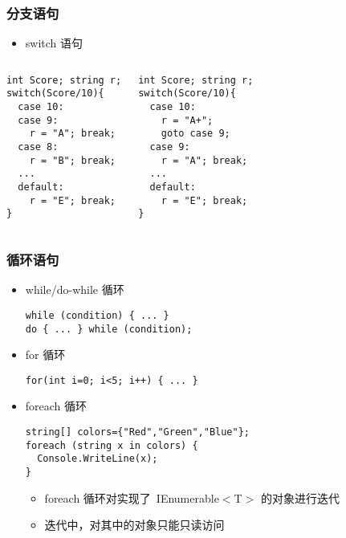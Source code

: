 \begin{frame}[fragile]
\frametitle{分支语句}
  \begin{itemize}
  \item switch 语句
  \end{itemize}
  \begin{columns}
\begin{lstlisting}
int Score; string r;
switch(Score/10){
  case 10:
  case 9:
    r = "A"; break;
  case 8:
    r = "B"; break;
  ...
  default:
    r = "E"; break;
}

\end{lstlisting}
\begin{lstlisting}
int Score; string r;
switch(Score/10){
  case 10:
    r = "A+";
    goto case 9;
  case 9:
    r = "A"; break;
  ...
  default:
    r = "E"; break;
}

\end{lstlisting}
  \end{columns}
\end{frame}
\begin{frame}[fragile]
\frametitle{循环语句}
\begin{itemize}
\item while/do-while 循环
\begin{lstlisting}
while (condition) { ... }
do { ... } while (condition);
\end{lstlisting}
  \pause
\item for 循环
\begin{lstlisting}
for(int i=0; i<5; i++) { ... }
\end{lstlisting}
  \pause
\item foreach 循环
\begin{lstlisting}
string[] colors={"Red","Green","Blue"};
foreach (string x in colors) {
  Console.WriteLine(x);
}
\end{lstlisting}
\begin{itemize}
\item foreach 循环对实现了~IEnumerable$<$T$>$ 的对象进行迭代
\item 迭代中，对其中的对象只能只读访问
\end{itemize}
\end{itemize}
\end{frame}

